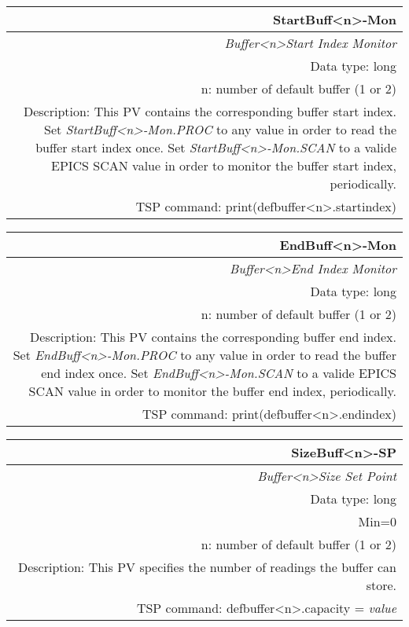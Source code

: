\documentclass[openany]{article}
\begin{document}
		\begin{tabular}{N}
			\hline
			\bfseries StartBuff\textless n\textgreater-Mon\label{pv:startbuff-mon} \\ \hline
			\emph{Buffer\textless n\textgreater Start Index Monitor} \\
			Data type: long \\
			n: number of default buffer (1 or 2) \\
			Description: This PV contains the corresponding buffer start index. Set \emph{StartBuff\textless n\textgreater-Mon.PROC} to any value in order to read the buffer start index once. Set \emph{StartBuff\textless n\textgreater-Mon.SCAN} to a valide EPICS SCAN value in order to monitor the buffer start index, periodically. \\
			TSP command: print(defbuffer\textless n\textgreater.startindex)
		\end{tabular}

		\begin{tabular}{N}
			\hline
			\bfseries EndBuff\textless n\textgreater-Mon\label{pv:endbuff-mon} \\ \hline
			\emph{Buffer\textless n\textgreater End Index Monitor} \\
			Data type: long \\
			n: number of default buffer (1 or 2) \\
			Description: This PV contains the corresponding buffer end index. Set \emph{EndBuff\textless n\textgreater-Mon.PROC} to any value in order to read the buffer end index once. Set \emph{EndBuff\textless n\textgreater-Mon.SCAN} to a valide EPICS SCAN value in order to monitor the buffer end index, periodically. \\
			TSP command: print(defbuffer\textless n\textgreater.endindex)
		\end{tabular}

		\begin{tabular}{N}
			\hline
			\bfseries SizeBuff\textless n\textgreater-SP\label{pv:sizebuff-sp} \\ \hline
			\emph{Buffer\textless n\textgreater Size Set Point} \\
			Data type: long \\
			Min=0 \\
			n: number of default buffer (1 or 2) \\
			Description: This PV specifies the number of readings the buffer can store. \\
			TSP command: defbuffer\textless n\textgreater.capacity = \emph{value}
		\end{tabular}
\end{document}
